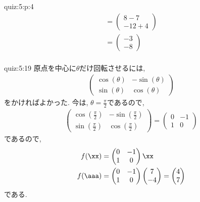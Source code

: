 \begin{answerof}{quiz:5:p:4}
\begin{align*}
  =\begin{pmatrix}8-7\\-12+4\end{pmatrix}\\
  =\begin{pmatrix}-3\\-8\end{pmatrix}\\
\end{align*}
\end{answerof}

\begin{answerof}{quiz:5:19}
  原点を中心に$\theta$だけ回転させるには,
  \begin{align*}
    \begin{pmatrix}
      \cos(\theta)&-\sin(\theta)\\
      \sin(\theta)&\cos(\theta)
    \end{pmatrix}
  \end{align*}
  をかければよかった.
  今は, $\theta=\frac{\pi}{2}$であるので,
  \begin{align*}
    \begin{pmatrix}
      \cos(\frac{\pi}{2})&-\sin(\frac{\pi}{2})\\
      \sin(\frac{\pi}{2})&\cos(\frac{\pi}{2})
    \end{pmatrix}
    =
    \begin{pmatrix}
      0&-1\\
      1&0
    \end{pmatrix}
  \end{align*}
  であるので,
  \begin{align*}
    f(\xx)&=
    \begin{pmatrix}
      0&-1\\
      1&0
    \end{pmatrix}
    \xx\\
    f(\aaa)&=
    \begin{pmatrix}
      0&-1\\
      1&0
    \end{pmatrix}
    \begin{pmatrix}
      7\\
      -4
    \end{pmatrix}
    =
    \begin{pmatrix}
      4\\7
    \end{pmatrix}
  \end{align*}
  である.



\end{answerof}
